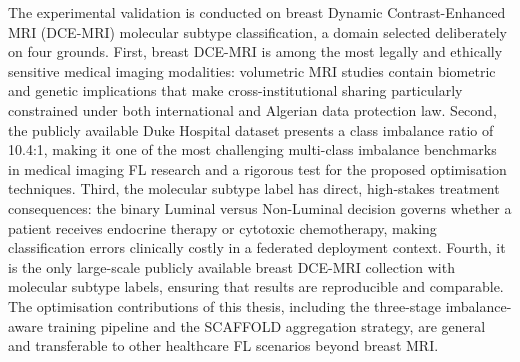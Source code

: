 The experimental validation is conducted on breast
Dynamic Contrast-Enhanced MRI (DCE-MRI) molecular
subtype classification, a domain selected deliberately
on four grounds.
First, breast DCE-MRI is among the most legally and
ethically sensitive medical imaging modalities:
volumetric MRI studies contain biometric and genetic
implications that make cross-institutional sharing
particularly constrained under both international and
Algerian data protection law.
Second, the publicly available Duke Hospital dataset
\cite{saha2018,alves2023breastmri} presents a class
imbalance ratio of 10.4:1, making it one of the most
challenging multi-class imbalance benchmarks in medical
imaging FL research and a rigorous test for the
proposed optimisation techniques.
Third, the molecular subtype label has direct,
high-stakes treatment consequences: the binary
Luminal versus Non-Luminal decision governs whether
a patient receives endocrine therapy or cytotoxic
chemotherapy, making classification errors clinically
costly in a federated deployment context.
Fourth, it is the only large-scale publicly available
breast DCE-MRI collection with molecular subtype
labels, ensuring that results are reproducible and
comparable.
The optimisation contributions of this thesis,
including the three-stage imbalance-aware training
pipeline and the SCAFFOLD aggregation strategy, are
general and transferable to other healthcare FL
scenarios beyond breast MRI.

